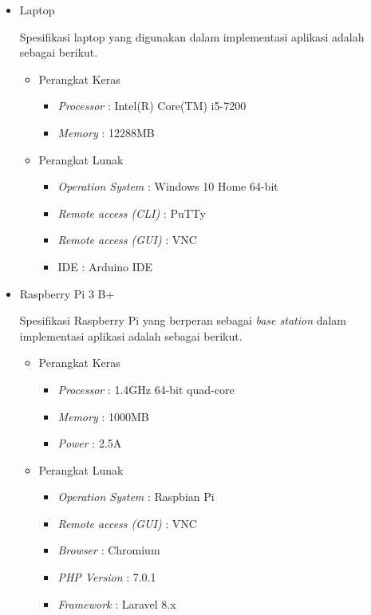    \begin{itemize}
       \item Laptop
       
       Spesifikasi laptop yang digunakan dalam implementasi aplikasi adalah sebagai berikut.
       
       \begin{itemize}
           \item Perangkat Keras
                \begin{itemize}
                    \item \textit{Processor} : Intel(R) Core(TM) i5-7200 
                    \item \textit{Memory} : 12288MB
                \end{itemize}
           
           \item Perangkat Lunak
                \begin{itemize}
                    \item \textit{Operation System} : Windows 10 Home 64-bit
                    \item \textit{Remote access (CLI)} : PuTTy
                    \item \textit{Remote access (GUI)} : VNC
                    \item  IDE : Arduino IDE 
                \end{itemize}
       \end{itemize}
       
        
       
       \item Raspberry Pi 3 B+
       
       Spesifikasi Raspberry Pi yang berperan sebagai \textit{base station} dalam implementasi aplikasi adalah sebagai berikut.
       
       \begin{itemize}
           \item Perangkat Keras
                \begin{itemize}
                    \item \textit{Processor} : 1.4GHz 64-bit quad-core 
                    \item \textit{Memory} : 1000MB
                    \item \textit{Power} : 2.5A
                \end{itemize}
           
           \item Perangkat Lunak
                \begin{itemize}
                    \item \textit{Operation System} : Raspbian Pi
                    \item \textit{Remote access (GUI)} : VNC
                    \item \textit{Browser} : Chromium
                    \item \textit{PHP Version} : 7.0.1
                    \item \textit{Framework} : Laravel 8.x
                \end{itemize}
       \end{itemize}
       

\end{itemize}
